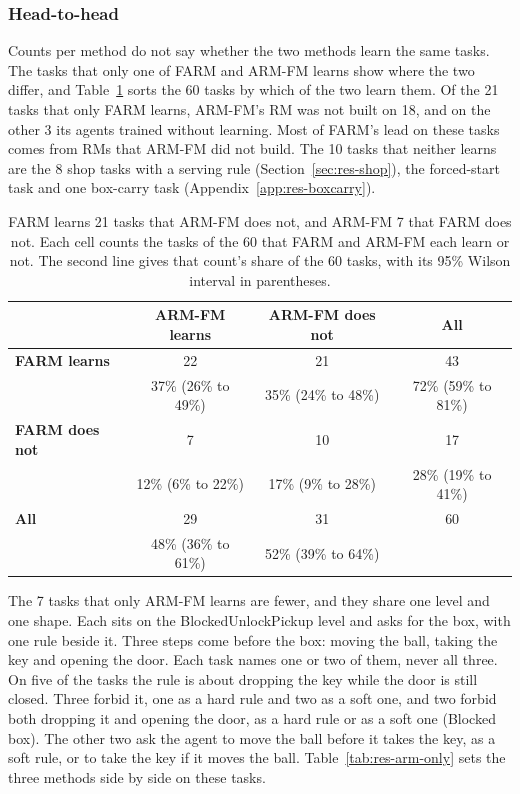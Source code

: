 \documentclass[11pt,english,listoffigures,listoftables]{tfgetsinf}
\begin{document}
\subsubsection{Head-to-head}
Counts per method do not say whether the two methods learn the same tasks. The tasks that only one of FARM and ARM-FM learns show where the two differ, and Table~\ref{tab:res-h2h} sorts the 60 tasks by which of the two learn them. Of the 21 tasks that only FARM learns, ARM-FM's RM was not built on 18, and on the other 3 its agents trained without learning. Most of FARM's lead on these tasks comes from RMs that ARM-FM did not build. The 10 tasks that neither learns are the 8 shop tasks with a serving rule (Section~\ref{sec:res-shop}), the forced-start task and one box-carry task (Appendix~\ref{app:res-boxcarry}).

\begin{table}[H]
\centering
\footnotesize
\renewcommand{\arraystretch}{1.2}
\begin{tabular}{@{}lccc@{}}
\toprule
 & \textbf{ARM-FM learns} & \textbf{ARM-FM does not} & \textbf{All} \\ \midrule
\textbf{FARM learns} & 22 & 21 & 43 \\
 & {\scriptsize 37\% (26\% to 49\%)} & {\scriptsize 35\% (24\% to 48\%)} & {\scriptsize 72\% (59\% to 81\%)} \\ \addlinespace
\textbf{FARM does not} & 7 & 10 & 17 \\
 & {\scriptsize 12\% (6\% to 22\%)} & {\scriptsize 17\% (9\% to 28\%)} & {\scriptsize 28\% (19\% to 41\%)} \\ \midrule
\textbf{All} & 29 & 31 & 60 \\
 & {\scriptsize 48\% (36\% to 61\%)} & {\scriptsize 52\% (39\% to 64\%)} & \\ \bottomrule
\end{tabular}
\caption[Head-to-head of FARM and ARM-FM]{FARM learns 21 tasks that ARM-FM does not, and ARM-FM 7 that FARM does not. Each cell counts the tasks of the 60 that FARM and ARM-FM each learn or not. The second line gives that count's share of the 60 tasks, with its 95\% Wilson interval in parentheses.}
\label{tab:res-h2h}
\end{table}

The 7 tasks that only ARM-FM learns are fewer, and they share one level and one shape. Each sits on the BlockedUnlockPickup level and asks for the box, with one rule beside it. Three steps come before the box: moving the ball, taking the key and opening the door. Each task names one or two of them, never all three. On five of the tasks the rule is about dropping the key while the door is still closed. Three forbid it, one as a hard rule and two as a soft one, and two forbid both dropping it and opening the door, as a hard rule or as a soft one (Blocked box). The other two ask the agent to move the ball before it takes the key, as a soft rule, or to take the key if it moves the ball. Table~\ref{tab:res-arm-only} sets the three methods side by side on these tasks.
\end{document}
